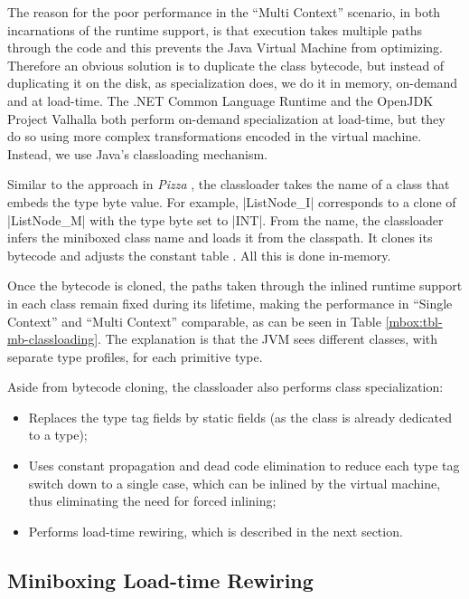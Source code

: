 The reason for the poor performance in the ``Multi Context'' scenario, in both incarnations of the runtime support, is that execution takes multiple paths through the code and this prevents the Java Virtual Machine from optimizing. Therefore an obvious solution is to duplicate the class bytecode, but instead of duplicating it on the disk, as specialization does, we do it in memory, on-demand and at load-time. The .NET Common Language Runtime \cite{ecma-dotnet, dot-net-generics} and the OpenJDK Project Valhalla \cite{valhalla-model2-announcement,goetz-specialization} both perform on-demand specialization at load-time, but they do so using more complex transformations encoded in the virtual machine. Instead, we use Java's classloading mechanism.

 Similar to the approach in {\em Pizza} \cite{pizza}, the classloader takes the name of a class that embeds the type byte value. For example, |ListNode_I| corresponds to a clone of |ListNode_M| with the type byte set to |INT|. From the name, the classloader infers the miniboxed class name and loads it from the classpath. It clones its bytecode and adjusts the constant table \cite{jsr-202}. All this is done in-memory.

Once the bytecode is cloned, the paths taken through the inlined runtime support in each class remain fixed during its lifetime, making the performance in ``Single Context'' and ``Multi Context'' comparable, as can be seen in Table \ref{mbox:tbl-mb-classloading}. The explanation is that the JVM sees different classes, with separate type profiles, for each primitive type.

Aside from bytecode cloning, the classloader also performs class specialization:
\begin{itemize}
\item Replaces the type tag fields by static fields (as the class is already dedicated to a type);
\item Uses constant propagation and dead code elimination to reduce each type tag switch down to a single case, which can be inlined by the virtual machine, thus eliminating the need for forced inlining;
\item Performs load-time rewiring, which is described in the next section.
\end{itemize}

\subsection{Miniboxing Load-time Rewiring}
\label{mbox:subsec-runtime-rewiring}

